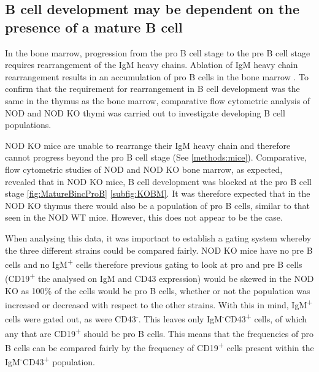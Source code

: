 \subsection{B cell development may be dependent on the presence of a mature B cell}

In the bone marrow, progression from the pro B cell stage to the pre B cell stage requires rearrangement of the IgM heavy chains.
Ablation of IgM heavy chain rearrangement results in an accumulation of pro B cells in the bone marrow \toref{}.
To confirm that the requirement for rearrangement in B cell development was the same in the thymus as the bone marrow, comparative flow cytometric analysis of NOD and NOD KO thymi was carried out to investigate developing B cell populations.

NOD KO mice are unable to rearrange their IgM heavy chain and therefore cannot progress beyond the pro B cell stage (See \cref{methods:mice}). 
Comparative, flow cytometric studies of NOD and NOD KO bone marrow, as expected, revealed that in NOD KO mice, B cell development was blocked at the pro B cell stage \cref{fig:MatureBincProB} \ref{subfig:KOBM}.
It was therefore expected that in the NOD KO thymus there would also be a population of pro B cells, similar to that seen in the NOD WT mice. 
However, this does not appear to be the case.

When analysing this data, it was important to establish a gating system whereby the three different strains could be compared fairly.
NOD KO mice have no pre B cells and no IgM\textsuperscript{+} cells therefore previous gating to look at pro and pre B cells (CD19\textsuperscript{+} the analysed on IgM and CD43 expression) would be skewed in the NOD KO as 100\% of the cells would be pro B cells, whether or not the population was increased or decreased with respect to the other strains.
With this in mind, IgM\textsuperscript{+} cells were gated out, as were CD43\textsuperscript{-}.
This leaves only IgM\textsuperscript{-}CD43\textsuperscript{+} cells, of which any that are CD19\textsuperscript{+} should be pro B cells.
This means that the frequencies of pro B cells can be compared fairly by the frequency of CD19\textsuperscript{+} cells present within the IgM\textsuperscript{-}CD43\textsuperscript{+} population.

